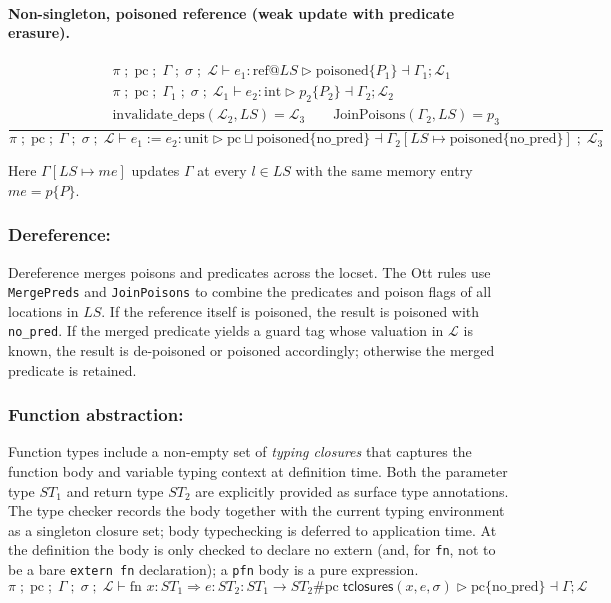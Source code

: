 \documentclass[12pt]{article}
\begin{document}
\paragraph{Non-singleton, poisoned reference (weak update with predicate erasure).}
\[
\frac{\begin{array}{c}
\pi \; ;\; \text{pc} \; ;\; \Gamma \; ;\; \sigma \; ;\; \mathcal{L} \vdash e_1 : \text{ref} @ LS \triangleright \text{poisoned} \{ P_1 \} \dashv \Gamma_1 ; \mathcal{L}_1 \\
\pi \; ;\; \text{pc} \; ;\; \Gamma_1 \; ;\; \sigma \; ;\; \mathcal{L}_1 \vdash e_2 : \text{int} \triangleright p_2 \{ P_2 \} \dashv \Gamma_2 ; \mathcal{L}_2 \\
\text{invalidate\_deps}(\mathcal{L}_2, LS) = \mathcal{L}_3 \qquad \text{JoinPoisons}(\Gamma_2, LS) = p_3
\end{array}}
{\pi \; ;\; \text{pc} \; ;\; \Gamma \; ;\; \sigma \; ;\; \mathcal{L} \vdash e_1 := e_2 : \text{unit} \triangleright \text{pc} \sqcup \text{poisoned} \{ \text{no\_pred} \} \dashv \Gamma_2[LS \mapsto \text{poisoned} \{ \text{no\_pred} \}] \; ;\; \mathcal{L}_3}
\]

Here $\Gamma[LS \mapsto me]$ updates $\Gamma$ at every $l \in LS$ with the same memory entry $me = p\{P\}$.

\subsubsection*{Dereference:}
Dereference merges poisons and predicates across the locset. The Ott rules use
\texttt{MergePreds} and \texttt{JoinPoisons} to combine the predicates and poison
flags of all locations in $LS$. If the reference itself is poisoned, the result
is poisoned with \texttt{no\_pred}. If the merged predicate yields a guard tag
whose valuation in $\mathcal{L}$ is known, the result is de-poisoned or poisoned
accordingly; otherwise the merged predicate is retained.

\subsubsection*{Function abstraction:}
Function types include a non-empty set of \emph{typing closures} that captures
the function body and variable typing context at definition time. Both the
parameter type $ST_1$ and return type $ST_2$ are explicitly provided as surface
type annotations. The type checker records the body together with the current
typing environment as a singleton closure set; body typechecking is deferred to
application time.  At the definition the body is only checked to declare no
extern (and, for \texttt{fn}, not to be a bare \texttt{extern fn}
declaration); a \texttt{pfn} body is a pure expression.
\[
\pi \; ;\; \text{pc} \; ;\; \Gamma \; ;\; \sigma \; ;\; \mathcal{L} \vdash
  \text{fn } x : ST_1 \Rightarrow e : ST_2
  : ST_1 \rightarrow ST_2 \# \text{pc} \; \mathsf{tclosures}(x, e, \sigma) \triangleright \text{pc} \{ \text{no\_pred} \} \dashv \Gamma ; \mathcal{L}
\]
\end{document}
